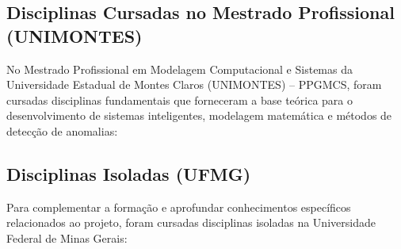 \subsection{Disciplinas Cursadas no Mestrado Profissional (UNIMONTES)}

No Mestrado Profissional em Modelagem Computacional e Sistemas da Universidade Estadual de Montes Claros (UNIMONTES) -- PPGMCS, foram cursadas disciplinas fundamentais que forneceram a base teórica para o desenvolvimento de sistemas inteligentes, modelagem matemática e métodos de detecção de anomalias:

\begin{table}[ht]
\centering
\caption{Disciplinas Cursadas no Programa de Mestrado Profissional (UNIMONTES)}
\label{tab:disciplinas_mestrado}
\end{table}

\subsection{Disciplinas Isoladas (UFMG)}

Para complementar a formação e aprofundar conhecimentos específicos relacionados ao projeto, foram cursadas disciplinas isoladas na Universidade Federal de Minas Gerais:

